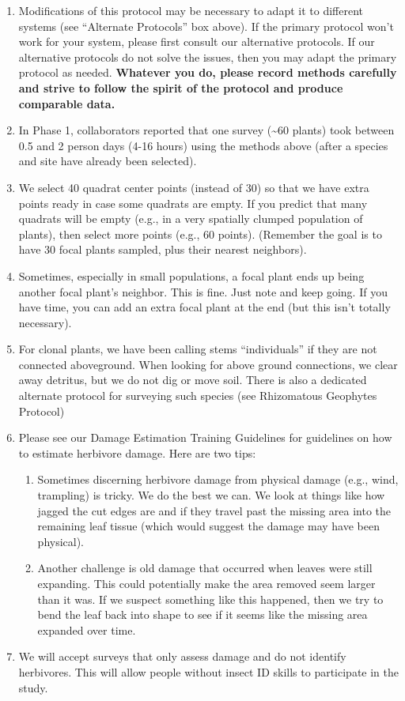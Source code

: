 \documentclass[
  letterpaper,
  oneside,
  open=any]{scrbook}
\begin{document}
\begin{enumerate}
\def\labelenumi{\arabic{enumi}.}
\item
  Modifications of this protocol may be necessary to adapt it to
  different systems (see ``Alternate Protocols'' box above). If the
  primary protocol won't work for your system, please first consult our
  alternative protocols. If our alternative protocols do not solve the
  issues, then you may adapt the primary protocol as needed.
  \textbf{Whatever you do, please record methods carefully and strive to
  follow the spirit of the protocol and produce comparable data.}
\item
  In Phase 1, collaborators reported that one survey (\textasciitilde60
  plants) took between 0.5 and 2 person days (4-16 hours) using the
  methods above (after a species and site have already been selected).
\item
  We select 40 quadrat center points (instead of 30) so that we have
  extra points ready in case some quadrats are empty. If you predict
  that many quadrats will be empty (e.g., in a very spatially clumped
  population of plants), then select more points (e.g., 60 points).
  (Remember the goal is to have 30 focal plants sampled, plus their
  nearest neighbors).
\item
  Sometimes, especially in small populations, a focal plant ends up
  being another focal plant's neighbor. This is fine. Just note and keep
  going. If you have time, you can add an extra focal plant at the end
  (but this isn't totally necessary).
\item
  For clonal plants, we have been calling stems ``individuals'' if they
  are not connected aboveground. When looking for above ground
  connections, we clear away detritus, but we do not dig or move soil.
  There is also a dedicated alternate protocol for surveying such
  species (see Rhizomatous Geophytes Protocol)
\item
  Please see our Damage Estimation Training Guidelines for guidelines on
  how to estimate herbivore damage. Here are two tips:

  \begin{enumerate}
  \def\labelenumii{\alph{enumii}.}
  \item
    Sometimes discerning herbivore damage from physical damage (e.g.,
    wind, trampling) is tricky. We do the best we can. We look at things
    like how jagged the cut edges are and if they travel past the
    missing area into the remaining leaf tissue (which would suggest the
    damage may have been physical).
  \item
    Another challenge is old damage that occurred when leaves were still
    expanding. This could potentially make the area removed seem larger
    than it was. If we suspect something like this happened, then we try
    to bend the leaf back into shape to see if it seems like the missing
    area expanded over time.
  \end{enumerate}
\item
  We will accept surveys that only assess damage and do not identify
  herbivores. This will allow people without insect ID skills to
  participate in the study.
\end{enumerate}
\end{document}
